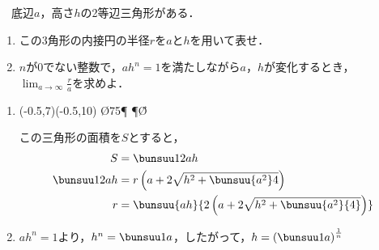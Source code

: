 \begin{problem}
  　底辺$a$，高さ$h$の2等辺三角形がある．
\begin{enumerate}
\item この3角形の内接円の半径$r$を$a$と$h$を用いて表せ．
\item $n$が0でない整数で，$ah^n=1$を満たしながら$a$，$h$が変化するとき，
$\displaystyle\lim_{a\to\infty}\frac{r}{a}$を求めよ．
\end{enumerate}
\end{problem}



\begin{enumerate}
  \item
  \begin{mawarikomi}{}{
\begin{pszahyou*}[ul=4mm](-0.5,7)(-0.5,10)
  \kandk\O{75}\P
  \Suisen\P\O\A\H
  \Takakkei{\O\A\P}
  \Drawline{\P\H}
\end{pszahyou*}}
この三角形の面積を$S$とすると，
\begin{align*}
  S &= \bunsuu12ah \\
  \bunsuu12ah &= r\left(a + 2\sqrt{h^2 + \bunsuu{a^2}4}\right) \\
  r &= \bunsuu{ah}{2\left(a + 2\sqrt{h^2 + \bunsuu{a^2}{4}}\right)}
\end{align*}
\end{mawarikomi}

\item $ah^n = 1$より，$h^n = \bunsuu1a$，したがって，$h = \left(\bunsuu1a\right)^{\frac1{n}}$

\end{enumerate}
